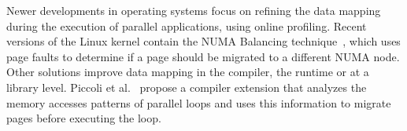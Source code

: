 Newer developments in operating systems focus on refining the data mapping during the execution of parallel applications, using online profiling.
Recent versions of the Linux kernel contain the
NUMA Balancing technique~\cite{Corbet}, which uses page faults to determine if
a page should be migrated to a different NUMA node.%
Other solutions improve data mapping in the compiler, the runtime or at a library level.
Piccoli et al.~\cite{Piccoli2014} propose a compiler extension that analyzes
the memory accesses patterns of parallel loops and uses this information to migrate
pages before executing the loop.


